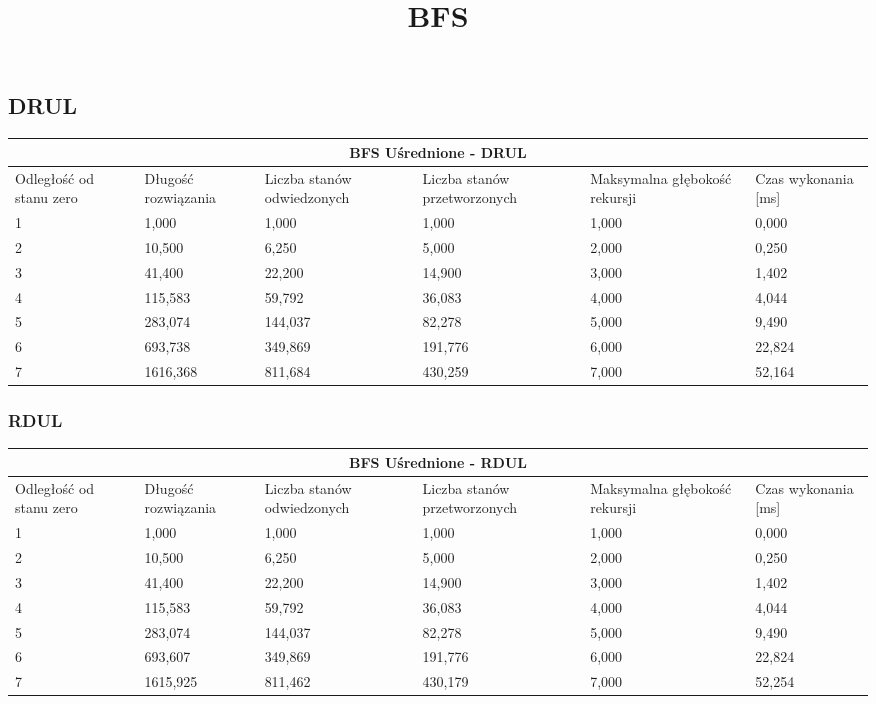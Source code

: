 \documentclass{classrep}
\begin{document}
{
\begin{center}
	\title{\textbf{BFS}}
\end{center}
\subsection{DRUL}
\begin{center}
	\begin{tabular}{ | p{1.6cm} | p{1.4cm} | p{1.8cm} | p{2cm} | p{2.2cm} | p{2cm} | }
	\hline
	\multicolumn{6}{|c|}{BFS Uśrednione - DRUL} \\
	\hline
	Odległość od stanu zero & Długość rozwiązania & Liczba stanów odwiedzonych & Liczba stanów przetworzonych & Maksymalna głębokość rekursji & Czas wykonania [ms]\\
	\hline
	1 & 1,000 & 1,000 & 1,000 & 1,000 & 0,000 \\
	\hline
	2 & 10,500 & 6,250 & 5,000 & 2,000& 0,250 \\
	\hline
	3 & 41,400&	22,200& 14,900& 3,000 & 1,402 \\
	\hline
	4 & 115,583 & 59,792 & 36,083 & 4,000 & 4,044 \\
	\hline
	5 & 283,074 & 144,037 &	82,278 & 5,000 & 9,490 \\
	\hline
	6 & 693,738 & 349,869 & 191,776 & 6,000 &22,824 \\
	\hline
	7 & 1616,368 & 811,684 & 430,259 & 7,000& 52,164 \\
	\hline
	\end{tabular}
\end{center}

\subsubsection{RDUL}
\begin{center}
	\begin{tabular}{ | p{1.6cm} | p{1.4cm} | p{1.8cm} | p{2cm} | p{2.2cm} | p{2cm} | }
	\hline
	\multicolumn{6}{|c|}{BFS Uśrednione - RDUL} \\
	\hline
	Odległość od stanu zero & Długość rozwiązania & Liczba stanów odwiedzonych & Liczba stanów przetworzonych & Maksymalna głębokość rekursji & Czas wykonania [ms]\\
	\hline
	1 & 1,000 & 1,000 & 1,000 & 1,000 & 0,000 \\
	\hline
	2 & 10,500 & 6,250 & 5,000 & 2,000& 0,250 \\
	\hline
	3 & 41,400&	22,200& 14,900& 3,000 & 1,402 \\
	\hline
	4 & 115,583 & 59,792 & 36,083 & 4,000 & 4,044 \\
	\hline
	5 & 283,074 & 144,037 &	82,278 & 5,000 & 9,490 \\
	\hline
	6 & 693,607 & 349,869 & 191,776 & 6,000 & 22,824 \\
	\hline
	7 & 1615,925 & 811,462 & 430,179 & 7,000& 52,254 \\
	\hline
	\end{tabular}
\end{center}

}
\end{document}
